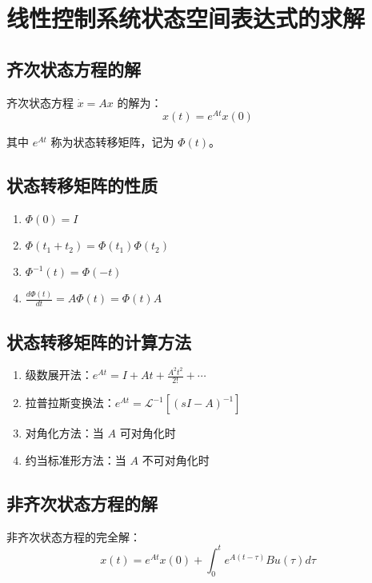 \section{线性控制系统状态空间表达式的求解}

\subsection{齐次状态方程的解}
齐次状态方程 $\dot{x} = Ax$ 的解为：
\[x(t) = e^{At}x(0)\]

其中 $e^{At}$ 称为状态转移矩阵，记为 $\Phi(t)$。

\subsection{状态转移矩阵的性质}
\begin{enumerate}
    \item $\Phi(0) = I$
    \item $\Phi(t_1 + t_2) = \Phi(t_1)\Phi(t_2)$
    \item $\Phi^{-1}(t) = \Phi(-t)$
    \item $\frac{d\Phi(t)}{dt} = A\Phi(t) = \Phi(t)A$
\end{enumerate}

\subsection{状态转移矩阵的计算方法}
\begin{enumerate}
    \item 级数展开法：$e^{At} = I + At + \frac{A^2t^2}{2!} + \cdots$
    \item 拉普拉斯变换法：$e^{At} = \mathcal{L}^{-1}[(sI-A)^{-1}]$
    \item 对角化方法：当 $A$ 可对角化时
    \item 约当标准形方法：当 $A$ 不可对角化时
\end{enumerate}

\subsection{非齐次状态方程的解}
非齐次状态方程的完全解：
\[x(t) = e^{At}x(0) + \int_0^t e^{A(t-\tau)}Bu(\tau)d\tau\]